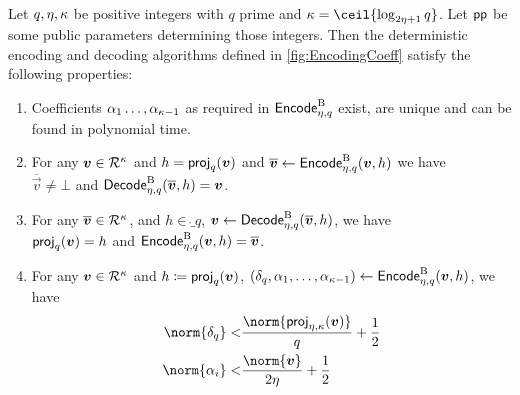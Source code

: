 \begin{lemma}\label{lem:latencode}
Let $q,\eta,\kappa$ be positive integers with $q$ prime and $\limbs = \ceil{\log_{2\eta+1}q}$. Let $\mathsf{pp}$ be some public parameters determining those integers.
Then the deterministic encoding and decoding algorithms defined in \autoref{fig:EncodingCoeff} satisfy the following properties:
\begin{enumerate}
 \item Coefficients $\alpha_1\ldots,\alpha_{\kappa-1}$ as required in $\mathsf{Encode}^{\textup{B}}_{\eta,q}$ exist, are unique and can be found in polynomial time.\label{item:basis}
 \item For any $\boldsymbol{v}\in\mathcal{R}^\kappa$ and $h = \mathsf{proj}_{q}(\boldsymbol{v})$ and $\overline{\boldsymbol{v}} \gets \mathsf{Encode}^{\textup{B}}_{\eta,q}(\boldsymbol{v}, h)$ we have\\
 $\overline{\vec{v}}\neq \bot$ and $\mathsf{Decode}^{\textup{B}}_{\eta,q}(\overline{\boldsymbol{v}}, h) = \boldsymbol{v}$.\label{item:inverse1}
 \item For any $\overline{\boldsymbol{v}}\in\mathcal{R}^\kappa$, and $h\in\ring_q$, $\boldsymbol{v}\gets\mathsf{Decode}^{\textup{B}}_{\eta,q}(\overline{\boldsymbol{v}}, h)$, we have\\
 $\mathsf{proj}_{q}(\boldsymbol{v})  = h$ and $\mathsf{Encode}^{\textup{B}}_{\eta,q}(\boldsymbol{v}, h) = \overline{\boldsymbol{v}}$.\label{item:inverse2}
 \item For any $\boldsymbol{v}\in\mathcal{R}^\kappa$ and $h \coloneqq \mathsf{proj}_{q}(\boldsymbol{v})$, $(\delta_q,\alpha_1,\ldots,\alpha_{\kappa-1}) \gets \mathsf{Encode}^{\textup{B}}_{\eta,q}(\boldsymbol{v},h)$, we have
 \begin{align*}
   \norm{\delta_q} <& \frac{\norm{\projring(\vec{v})}}{q} + \frac{1}{2}\\
   \norm{\alpha_i} <& \frac{\norm{\vec{v}}}{2\eta} + \frac{1}{2} 
 \end{align*}\label{item:latencodebounds}
\end{enumerate}
\end{lemma}
